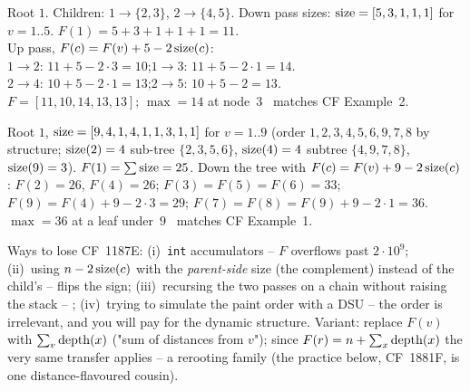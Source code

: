 \begin{tracebox}[Official Example~2: $n=5$, edges $1\text{--}2,1\text{--}3,2\text{--}4,2\text{--}5$ $\Rightarrow$ 14]
Root $1$. Children: $1\!\to\!\{2,3\}$, $2\!\to\!\{4,5\}$. Down pass sizes:
$\operatorname{size}=[5,3,1,1,1]$ for $v=1..5$. $F(1)=5{+}3{+}1{+}1{+}1=11$.\\
Up pass, $F(c)=F(v)+5-2\operatorname{size}(c)$:\\
$1\!\to\!2$: $11+5-2{\cdot}3=10$;\quad $1\!\to\!3$: $11+5-2{\cdot}1=14$.\\
$2\!\to\!4$: $10+5-2{\cdot}1=13$;\quad $2\!\to\!5$: $10+5-2=13$.\\
$F=[11,10,14,13,13]$; $\max=14$ at node~$3$ \checkmark\ matches CF Example~2.
\end{tracebox}

\begin{tracebox}[Official Example~1 folds the same rule: $n=9$ $\Rightarrow$ 36]
Root $1$, $\operatorname{size}=[9,4,1,4,1,1,3,1,1]$ for $v=1..9$ (order $1,2,3,4,5,6,9,7,8$
by structure; $\operatorname{size}(2)=4$ sub-tree $\{2,3,5,6\}$, $\operatorname{size}(4)=4$ subtree
$\{4,9,7,8\}$, $\operatorname{size}(9)=3$). $F(1)=\sum\operatorname{size}=25$. Down the tree with
$F(c)=F(v)+9-2\operatorname{size}(c)$: $F(2)=26$, $F(4)=26$; $F(3)=F(5)=F(6)=33$;
$F(9)=F(4)+9-2{\cdot}3=29$; $F(7)=F(8)=F(9)+9-2{\cdot}1=36$. $\max=36$
at a leaf under~$9$ \checkmark\ matches CF Example~1.
\end{tracebox}


\begin{warningbox}
Ways to lose CF~1187E: (i)~\lstinline{int} accumulators -- $F$ overflows past
$2\cdot10^{9}$; (ii)~using $n-2\operatorname{size}(c)$ with the \emph{parent-side} size (the
complement) instead of the child's -- flips the sign; (iii)~recursing the two
passes on a chain without raising the stack -- \re; (iv)~trying to simulate the
paint order with a DSU -- the order is irrelevant, and you will pay for the
dynamic structure. Variant: replace $F(v)$ with $\sum_v \operatorname{depth}(x)$
("sum of distances from $v$"); since $F(r)=n+\sum_x\operatorname{depth}(x)$ the very same
transfer applies -- a rerooting family (the practice below, CF~1881F, is one
distance-flavoured cousin).
\end{warningbox}


